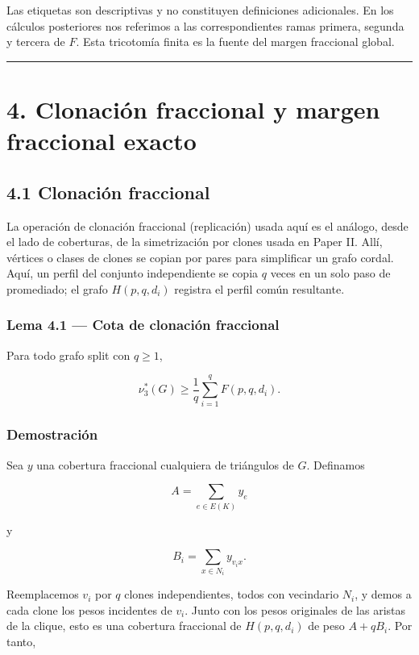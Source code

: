 \documentclass[
  spanish,
  11pt,
  a4paper,
]{article}
\begin{document}
Las etiquetas son descriptivas y no constituyen definiciones adicionales. En los cálculos posteriores nos referimos a las correspondientes ramas primera, segunda y tercera de \(F\). Esta tricotomía finita es la fuente del margen fraccional global.

\begin{center}\rule{0.5\linewidth}{0.5pt}\end{center}

\section{4. Clonación fraccional y margen fraccional exacto}\label{clonaciuxf3n-fraccional-y-margen-fraccional-exacto}

\subsection{4.1 Clonación fraccional}\label{clonaciuxf3n-fraccional}

La operación de clonación fraccional (replicación) usada aquí es el análogo, desde el lado de coberturas, de la simetrización por clones usada en Paper II. Allí, vértices o clases de clones se copian por pares para simplificar un grafo cordal. Aquí, un perfil del conjunto independiente se copia \(q\) veces en un solo paso de promediado; el grafo \(H(p,q,d_i)\) registra el perfil común resultante.

\subsubsection{Lema 4.1 --- Cota de clonación fraccional}\label{lema-4.1-cota-de-clonaciuxf3n-fraccional}

Para todo grafo split con \(q\ge1\),

\[
\boxed{
\nu_3^*(G)
\ge
\frac1q\sum_{i=1}^qF(p,q,d_i).
}
\tag{4.1}
\]

\subsubsection{Demostración}\label{demostraciuxf3n-1}

Sea \(y\) una cobertura fraccional cualquiera de triángulos de \(G\). Definamos

\[
A=\sum_{e\in E(K)}y_e
\]

y

\[
B_i=\sum_{x\in N_i}y_{v_ix}.
\]

Reemplacemos \(v_i\) por \(q\) clones independientes, todos con vecindario \(N_i\), y demos a cada clone los pesos incidentes de \(v_i\). Junto con los pesos originales de las aristas de la clique, esto es una cobertura fraccional de \(H(p,q,d_i)\) de peso \(A+qB_i\). Por tanto,
\end{document}
